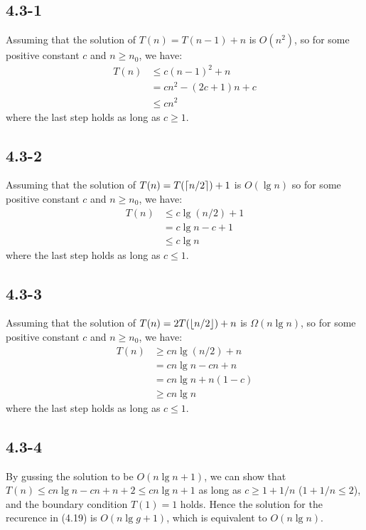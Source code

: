 \subsection{4.3-1}
    Assuming that the solution of $T(n) = T(n-1) + n$ is $O(n^2)$, so for some
    positive constant $c$ and $n \ge n_0$, we have:
    \begin{align*}
        T(n) & \le c(n - 1)^2 + n \\
             & = cn^2 - (2c + 1 )n + c \\
             & \le cn^2
    \end{align*}
    where the last step holds as long as $c \ge 1$.
\subsection{4.3-2}
    Assuming that the solution of $T(n) = T(\lceil n/2\rceil) + 1$ is $O(\lg n)$
    so for some positive constant $c$ and $n \ge n_0$, we have:
    \begin{align*}
        T(n) & \le c\lg(n/2) + 1 \\
             & = c\lg n - c + 1 \\
             & \le c\lg n
    \end{align*}
    where the last step holds as long as $c \le 1$.
\subsection{4.3-3}
    Assuming that the solution of $T(n) = 2T(\lfloor n/2\rfloor) + n$ is
    $\Omega(n\lg n)$, so for some positive constant $c$ and $n \ge n_0$, we have:
    \begin{align*}
        T(n) & \ge cn\lg(n/2) + n \\
             & = cn\lg n - cn + n \\
             & = cn\lg n + n(1-c) \\
             & \ge cn\lg n
    \end{align*}
    where the last step holds as long as $c \le 1$.
\subsection{4.3-4}
    By gussing the solution to be $O(n\lg n + 1)$, we can show that $T(n) \le
    cn\lg n - cn + n + 2 \le cn\lg n + 1$ as long as $c \ge 1 + 1/n$
    ($1 + 1/n \le 2$), and the boundary condition $T(1) = 1$ holds. Hence
    the solution for the recurence in (4.19) is $O(n\lg g + 1)$, which is
    equivalent to $O(n\lg n)$.
